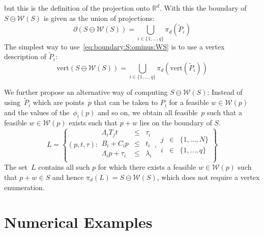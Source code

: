 \documentclass[final]{elsarticle}
\theoremstyle{remark}
\theoremstyle{definition}
\begin{document}
%
but this is the definition of the projection onto $\mathbb R^d$.
%
With this the boundary of $S\ominus \mathcal W(S)$ is given as the union of projections:
%
\begin{equation}\label{eq:boundary:S:ominus:WS}
 \partial(S\ominus\mathcal W(S)) = \bigcup_{i\in\{1,\dots,q\}}\pi_d\left(
\tilde P_i
 \right)
\end{equation}
%
The simplest way to use~\eqref{eq:boundary:S:ominus:WS} is to use a vertex description of $\tilde P_i$:
%
\begin{equation}\label{the:way:we:compute:p:pontryagin:differences}
  \text{vert}(S\ominus\mathcal W(S)) = \bigcup_{i\in\{1,\dots,q\}}\pi_d(\text{vert}(\tilde P_i))
\end{equation}

We further propose an alternative way of computing $S\ominus\mathcal W(S)$:
%
Instead of using~$\tilde P_i$ which are points~$p$ that can be taken to $P_i$ for a feasible $w\in\mathcal W(p)$ and the values of the~$\phi_i(p)$ and so on, we obtain all feasible~$p$ such that a feasible $w\in\mathcal W(p)$ exists such that $p+w$ lies on the boundary of $S$.
%
\begin{equation}
  L = \left\{(p,t,\tau):\begin{array}{rcl}
  \Lambda_iT_jt&\leq&\tau_i\\
  B_i+C_i p&\leq& t_i\\
  \Lambda_i p + \tau_i&\leq&\lambda_i\\
  \end{array},\begin{array}{rcl}
  j&\in&\{1,\dots,N\}\\
  i&\in&\{1,\dots,q\}\end{array}
  \right\}
\end{equation}
%
The set~$L$ contains all such $p$ for which there exists a feasible $w\in\mathcal W(p)$ such that $p+w\in S$ and hence $\pi_d(L)=S\ominus\mathcal W(S)$, which does not require a vertex enumeration.
%
%
%
%
%
\section{Numerical Examples}\label{sec:numerical:examples}
\end{document}
